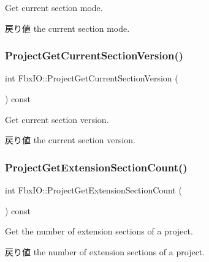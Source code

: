 Get current section mode. \begin{DoxyReturn}{戻り値}
the current section mode. 
\end{DoxyReturn}
\mbox{\label{class_fbx_i_o_a6785ab2f15b83908056963e342b89bd7}} 
\subsubsection{\texorpdfstring{Project\+Get\+Current\+Section\+Version()}{ProjectGetCurrentSectionVersion()}}
{\footnotesize\ttfamily int Fbx\+I\+O\+::\+Project\+Get\+Current\+Section\+Version (\begin{DoxyParamCaption}{ }\end{DoxyParamCaption}) const}

Get current section version. \begin{DoxyReturn}{戻り値}
the current section version. 
\end{DoxyReturn}
\mbox{\label{class_fbx_i_o_a9596d5f702a59e9fed8bf4bd6ca4152f}} 
\subsubsection{\texorpdfstring{Project\+Get\+Extension\+Section\+Count()}{ProjectGetExtensionSectionCount()}}
{\footnotesize\ttfamily int Fbx\+I\+O\+::\+Project\+Get\+Extension\+Section\+Count (\begin{DoxyParamCaption}{ }\end{DoxyParamCaption}) const}

Get the number of extension sections of a project. \begin{DoxyReturn}{戻り値}
the number of extension sections of a project. 
\end{DoxyReturn}
\mbox{\label{class_fbx_i_o_ad12d55a87d312364ece336d628c6e906}} 
